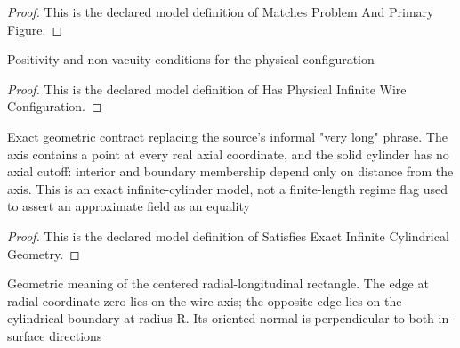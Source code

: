 \begin{proof}
  This is the declared model definition of Matches Problem And Primary Figure.
\end{proof}
\begin{definition}
  \label{def:physics:phyx-mini-0975:phyxminiproblems-problemphyxmini0975-hasphysicalinfinitewireconfiguration}
  Positivity and non-vacuity conditions for the physical configuration
\end{definition}
\begin{proof}
  This is the declared model definition of Has Physical Infinite Wire Configuration.
\end{proof}
\begin{definition}
  \label{def:physics:phyx-mini-0975:phyxminiproblems-problemphyxmini0975-satisfiesexactinfinitecylindricalgeometry}
  Exact geometric contract replacing the source's informal "very long" phrase. The axis contains a point at every real axial coordinate, and the solid cylinder has no axial cutoff: interior and boundary membership depend only on distance from the axis. This is an exact infinite-cylinder model, not a finite-length regime flag used to assert an approximate field as an equality
\end{definition}
\begin{proof}
  This is the declared model definition of Satisfies Exact Infinite Cylindrical Geometry.
\end{proof}
\begin{definition}
  \label{def:physics:phyx-mini-0975:phyxminiproblems-problemphyxmini0975-satisfiesradiallongitudinalrectanglegeometry}
  Geometric meaning of the centered radial-longitudinal rectangle. The edge at radial coordinate zero lies on the wire axis; the opposite edge lies on the cylindrical boundary at radius R. Its oriented normal is perpendicular to both in-surface directions
\end{definition}
